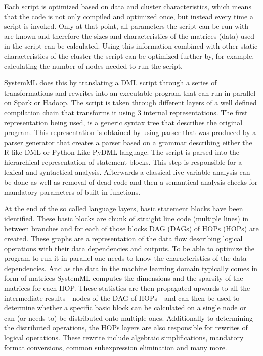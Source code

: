 Each script is optimized based on data and cluster characteristics, which means that the code is not only compiled and optimized once, but instead every time a script is invoked. Only at that point, all parameters the script can be run with are known and therefore the sizes and characteristics of the matrices (data) used in the script can be calculated. Using this information combined with other static characteristics of the cluster the script can be optimized further by, for example, calculating the number of nodes needed to run the script.\textsuperscript{\cite[p.~52]{Boehm2014SystemMLsPrograms}}


SystemML does this by translating a \acs{DML} script through a series of transformations and rewrites into an executable program that can run in parallel on Spark or Hadoop. The script is taken through different layers of a well defined compilation chain that transforms it using 3 internal representations.
The first representation being used, is a generic syntax tree that describes the original program. This representation is obtained by using parser that was produced by a parser generator that creates a parser based on a grammar describing either the R-like DML or Python-Like PyDML language. The script is parsed into the hierarchical representation of statement blocks. This step is responsible for a lexical and syntactical analysis. Afterwards a classical live variable analysis can be done as well as removal of dead code and then a semantical analysis checks for mandatory parameters of built-in functions.

At the end of the so called language layers, basic statement blocks have been identified. These basic blocks are chunk of straight line code (multiple lines) in between branches and for each of those blocks \acl{DAG} (\acs{DAG}s) of \acl{HOP}s (\acs{HOP}s) are created. These graphs are a representation of the data flow describing logical operations with their data dependencies and outputs.
To be able to optimize the program to run it in parallel one needs to know the characteristics of the data dependencies. And as the data in the machine learning domain typically comes in form of matrices SystemML computes the dimensions and the sparsity of the matrices for each \acl{HOP}. These statistics are then propagated upwards to all the intermediate results - nodes of the \acl{DAG} of \acs{HOP}s - and can then be used to determine whether a specific basic block can be calculated on a single node or can (or needs to) be distributed onto multiple ones. 
Additionally to determining the distributed operations, the \acs{HOP}s layers are also responsible for rewrites of logical operations. These rewrite include algebraic simplifications, mandatory format conversions, common subexpression elimination and many more. 

